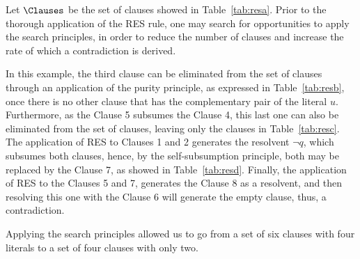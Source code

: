 \begin{example}
    Let $\Clauses$ be the set of clauses showed in Table~\ref{tab:resa}. Prior
    to the thorough application of the RES rule, one may search for
    opportunities to apply the search principles, in order to reduce the
    number of clauses and increase the rate of which a contradiction is derived.

    In this example, the third clause can be eliminated from the set of clauses
    through an application of the purity principle, as expressed in
    Table~\ref{tab:resb}, once there is no other clause that has the
    complementary pair of the literal $u$. 
    Furthermore, as the Clause 5 subsumes the Clause 4, this last one can also
    be eliminated from the set of clauses, leaving only the clauses in
    Table~\ref{tab:resc}.
    The application of RES to Clauses 1 and 2 generates the resolvent
    $\neg q$, which subsumes both clauses, hence, by the self-subsumption principle,
    both may be replaced by the Clause 7, as showed in Table~\ref{tab:resd}.
    Finally, the application of RES to the Clauses 5 and 7, generates the Clause
    8 as a resolvent, and then resolving this one with the Clause 6 will
    generate the empty clause, thus, a contradiction. 

    Applying the search principles allowed us to go from a set of six clauses
    with four literals to a set of four clauses with only two.


\end{example}
